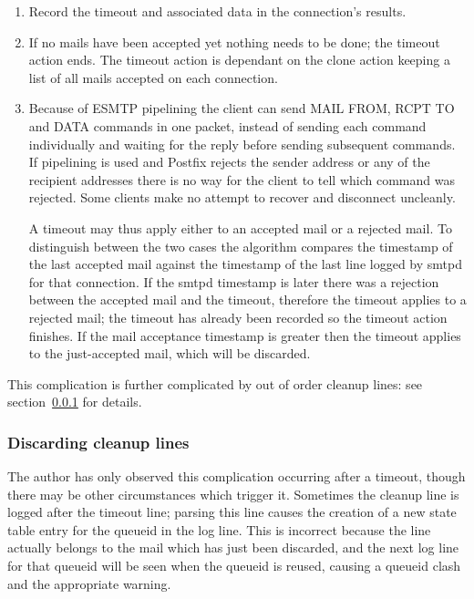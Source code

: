 \documentclass[a4paper,12pt,draft]{article}
\begin{document}
\begin{enumerate}

    \item Record the timeout and associated data in the connection's
        results.

    \item If no mails have been accepted yet nothing needs to be done; the
        timeout action ends.  The timeout action is dependant on the clone
        action keeping a list of all mails accepted on each connection.

    \item Because of ESMTP pipelining the client can send MAIL FROM, RCPT
        TO and DATA commands in one packet, instead of sending each command
        individually and waiting for the reply before sending subsequent
        commands.  If pipelining is used and Postfix rejects the sender
        address or any of the recipient addresses there is no way for the
        client to tell which command was rejected.  Some clients make no
        attempt to recover and disconnect uncleanly.

        A timeout may thus apply either to an accepted mail or a rejected
        mail.  To distinguish between the two cases the algorithm compares
        the timestamp of the last accepted mail against the timestamp of
        the last line logged by smtpd for that connection.  If the smtpd
        timestamp is later there was a rejection between the accepted mail
        and the timeout, therefore the timeout applies to a rejected mail;
        the timeout has already been recorded so the timeout action
        finishes.  If the mail acceptance timestamp is greater then the
        timeout applies to the just-accepted mail, which will be discarded.

\end{enumerate}

This complication is further complicated by out of order cleanup lines: see
section~\ref{discarding-cleanup-lines} for details.

\subsubsection{Discarding cleanup lines}

\label{discarding-cleanup-lines}

The author has only observed this complication occurring after a timeout,
though there may be other circumstances which trigger it.  Sometimes the
cleanup line is logged after the timeout line; parsing this line causes the
creation of a new state table entry for the queueid in the log line.  This
is incorrect because the line actually belongs to the mail which has just
been discarded, and the next log line for that queueid will be seen when
the queueid is reused, causing a queueid clash and the appropriate warning.
\end{document}
